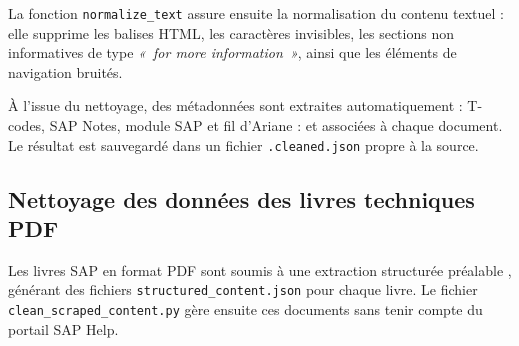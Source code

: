 La fonction \texttt{normalize\_text} assure ensuite la normalisation du contenu textuel : elle supprime les balises HTML, les caractères invisibles, les sections non informatives de type \textit{«~for more information~»}, ainsi que les éléments de navigation bruités.

À l'issue du nettoyage, des métadonnées sont extraites automatiquement : T-codes, SAP Notes, module SAP et fil d'Ariane : et associées à chaque document. Le résultat est sauvegardé dans un fichier \texttt{.cleaned.json} propre à la source.%
\subsection{Nettoyage des données des livres techniques PDF}
\label{subsec:nettoyage-pdf}

Les livres SAP en format PDF sont soumis à une extraction structurée préalable , générant des fichiers \texttt{structured\_content.json} pour chaque livre. Le fichier \texttt{clean\_scraped\_content.py} gère ensuite ces documents sans tenir compte du portail SAP Help.

